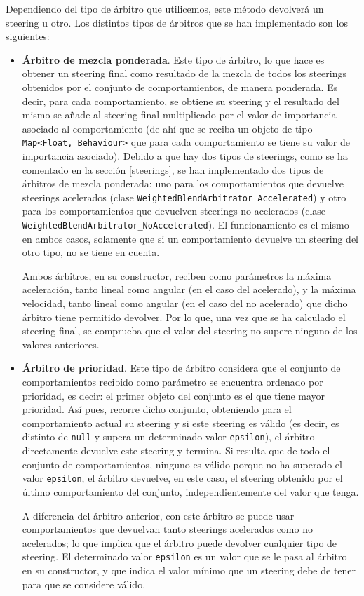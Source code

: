 Dependiendo del tipo de árbitro que utilicemos, este método devolverá un steering u otro. Los distintos tipos de árbitros que se han implementado son los siguientes:
\begin{itemize}
 \item \textbf{Árbitro de mezcla ponderada}. Este tipo de árbitro, lo que hace es obtener un steering final como resultado de la mezcla de todos los steerings obtenidos por el conjunto de comportamientos, de manera ponderada. Es decir, para cada comportamiento, se obtiene su steering y el resultado del mismo se añade al steering final multiplicado por el valor de importancia asociado al comportamiento (de ahí que se reciba un objeto de tipo \texttt{Map<Float, Behaviour>} que para cada comportamiento se tiene su valor de importancia asociado). Debido a que hay dos tipos de steerings, como se ha comentado en la sección \ref{steerings}, se han implementado dos tipos de árbitros de mezcla ponderada: uno para los comportamientos que devuelve steerings acelerados (clase \texttt{WeightedBlendArbitrator\_Accelerated}) y otro para los comportamientos que devuelven steerings no acelerados (clase \texttt{WeightedBlendArbitrator\_NoAccelerated}). El funcionamiento es el mismo en ambos casos, solamente que si un comportamiento devuelve un steering del otro tipo, no se tiene en cuenta. 
 
 Ambos árbitros, en su constructor, reciben como parámetros la máxima aceleración, tanto lineal como angular (en el caso del acelerado), y la máxima velocidad, tanto lineal como angular (en el caso del no acelerado) que dicho árbitro tiene permitido devolver. Por lo que, una vez que se ha calculado el steering final, se comprueba que el valor del steering no supere ninguno de los valores anteriores. 
 
 
 \item \textbf{Árbitro de prioridad}. Este tipo de árbitro considera que el conjunto de comportamientos recibido como parámetro se encuentra ordenado por prioridad, es decir: el primer objeto del conjunto es el que tiene mayor prioridad. Así pues, recorre dicho conjunto, obteniendo para el comportamiento actual su steering y si este steering es válido (es decir, es distinto de \texttt{null} y supera un determinado valor \texttt{epsilon}), el árbitro directamente devuelve este steering y termina. Si resulta que de todo el conjunto de comportamientos, ninguno es válido porque no ha superado el valor \texttt{epsilon}, el árbitro devuelve, en este caso, el steering obtenido por el último comportamiento del conjunto, independientemente del valor que tenga. 
 
 A diferencia del árbitro anterior, con este árbitro se puede usar comportamientos que devuelvan tanto steerings acelerados como no acelerados; lo que implica que el árbitro puede devolver cualquier tipo de steering. El determinado valor \texttt{epsilon} es un valor que se le pasa al árbitro en su constructor, y que indica el valor mínimo que un steering debe de tener para que se considere válido.
\end{itemize}







